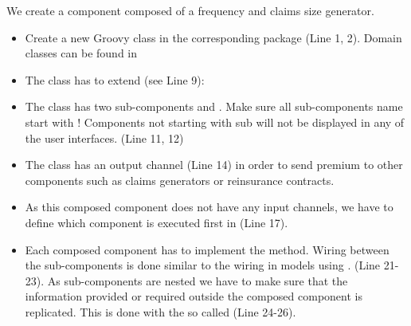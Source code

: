 We create a component composed of a frequency and claims size generator.

\begin{itemize}
  \item Create a new Groovy class in the corresponding package (Line 1, 2). Domain classes can be found in 
    \\ 
  \item The class has to extend (see Line 9):
    \\ 
  \item The class has two sub-components  and . Make sure all sub-components name start with ! Components not starting with sub will not be displayed in any of the user interfaces. (Line 11, 12)
  \item The class has an output channel  (Line 14) in order to send premium to other components such as claims generators or reinsurance contracts.
  \item As this composed component does not have any input channels, we have to define which component is executed first in  (Line 17).
    \\ 
  \item Each composed component has to implement the  method. Wiring between the sub-components is done similar to the wiring in models using . (Line 21-23). As sub-components are nested we have to make sure that the information provided or required outside the composed component is replicated. This is done with the so called  (Line 24-26).
    \\ 
\end{itemize}

